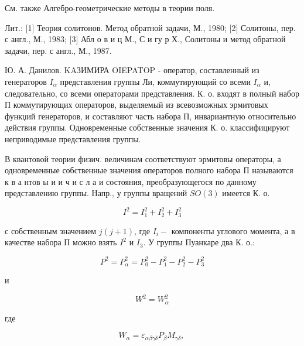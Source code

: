 \documentclass[10pt]{article}
\begin{document}
См. также Алгебро-геометрические методы в теории поля.



Лит.: [1] Теория солитонов. Метод обратной задачи, М., 1980; [2] Солитоны, пер. с англ., М., 1983; [3] Абл о в и ц М., С и гу р Х., Солитоны и метод обратной задачи, пер. с англ., М., 1987.



Ю. А. Данилов. KAЗИМИРА OIEPATOP - оператор, составленный из генераторов $I_{\alpha}$ представления группы Ли, коммутирующий со всеми $I_{\alpha}$ и, следовательно, со всеми операторами представления. К. о. входят в полный набор П коммутирующих операторов, выделяемый из всевозможных эрмитовых функџий генераторов, и составляют часть набора П, инвариантную относительно действия группы. Одновременные собственные значения К. о. классифицируют неприводимые представления группы.



В квантовой теории физич. величинам соответствуют эрмитовы операторы, а одновременные собственные значения операторов полного набора П называются к в а нтов ы и и ч и с л а и состояния, преобразующегося по данному представлению группы. Напр., у группы вращений $S O(3)$ имеется К. о.



\[

I^{2}=I_{1}^{2}+I_{2}^{2}+I_{3}^{2}

\]



с собственным значением $j(j+1)$, где $I_{i}-$ компоненты углового момента, а в качестве набора П можно взять $I^{2}$ и $I_{3}$. У группы Пуанкаре два К. о.:



\[

P^{2}=P_{\alpha}^{2}=P_{0}^{2}-P_{1}^{2}-P_{2}^{2}-P_{3}^{2}

\]



и



\[

W^{2}=W_{\alpha}^{2}

\]



где



\[

W_{\alpha}=\varepsilon_{\alpha \beta \gamma \delta} P_{\beta} M_{\gamma \delta} \text {, }

\]
\end{document}
